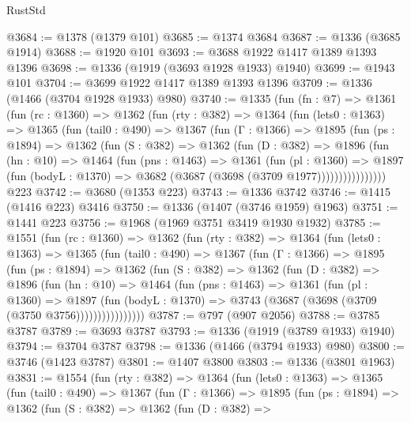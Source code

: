 \begin{lexlean}{RustStd}
\begin{coremodule}
@3684 := @1378 (@1379 @101)
@3685 := @1374 @3684
@3687 := @1336 (@3685 @1914)
@3688 := @1920 @101
@3693 := @3688 @1922 @1417 @1389 @1393 @1396
@3698 := @1336 (@1919 (@3693 @1928 @1933) @1940)
@3699 := @1943 @101
@3704 := @3699 @1922 @1417 @1389 @1393 @1396
@3709 := @1336 (@1466 (@3704 @1928 @1933) @980)
@3740 := @1335
    (fun (fn : @7) =>
    @1361
      (fun (rc : @1360) =>
      @1362
        (fun (rty : @382) =>
        @1364
          (fun (lets0 : @1363) =>
          @1365
            (fun (tail0 : @490) =>
            @1367
              (fun (Γ : @1366) =>
              @1895
                (fun (ps : @1894) =>
                @1362
                  (fun (S : @382) =>
                  @1362
                    (fun (D : @382) =>
                    @1896
                      (fun (hn : @10) =>
                      @1464
                        (fun (pns : @1463) =>
                        @1361
                          (fun (pl : @1360) =>
                          @1897
                            (fun (bodyL : @1370) => @3682 (@3687 (@3698 (@3709 @1977))))))))))))))))
    @223
@3742 := @3680 (@1353 @223)
@3743 := @1336 @3742
@3746 := @1415 (@1416 @223) @3416
@3750 := @1336 (@1407 (@3746 @1959) @1963)
@3751 := @1441 @223
@3756 := @1968 (@1969 @3751 @3419 @1930 @1932)
@3785 := @1551
    (fun (rc : @1360) =>
    @1362
      (fun (rty : @382) =>
      @1364
        (fun (lets0 : @1363) =>
        @1365
          (fun (tail0 : @490) =>
          @1367
            (fun (Γ : @1366) =>
            @1895
              (fun (ps : @1894) =>
              @1362
                (fun (S : @382) =>
                @1362
                  (fun (D : @382) =>
                  @1896
                    (fun (hn : @10) =>
                    @1464
                      (fun (pns : @1463) =>
                      @1361
                        (fun (pl : @1360) =>
                        @1897
                          (fun (bodyL : @1370) =>
                          @3743 (@3687 (@3698 (@3709 (@3750 @3756))))))))))))))))
@3787 := @797 (@907 @2056)
@3788 := @3785 @3787
@3789 := @3693 @3787
@3793 := @1336 (@1919 (@3789 @1933) @1940)
@3794 := @3704 @3787
@3798 := @1336 (@1466 (@3794 @1933) @980)
@3800 := @3746 (@1423 @3787)
@3801 := @1407 @3800
@3803 := @1336 (@3801 @1963)
@3831 := @1554
    (fun (rty : @382) =>
    @1364
      (fun (lets0 : @1363) =>
      @1365
        (fun (tail0 : @490) =>
        @1367
          (fun (Γ : @1366) =>
          @1895
            (fun (ps : @1894) =>
            @1362
              (fun (S : @382) =>
              @1362
                (fun (D : @382) =>

\end{coremodule}
\end{lexlean}
